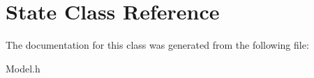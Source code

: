 \hypertarget{classState}{}\section{State Class Reference}
\label{classState}


The documentation for this class was generated from the following file\+:\begin{DoxyCompactItemize}
\item 
Model.\+h\end{DoxyCompactItemize}
